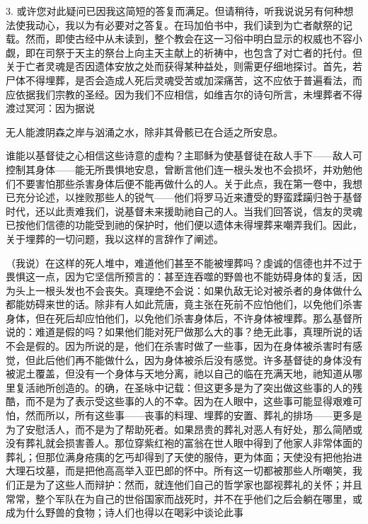 3. 或许您对此疑问已因我这简短的答复而满足。但请稍待，听我说说另有何种想法使我动心，我以为有必要对之答复。在玛加伯书中，我们读到为亡者献祭的记载。然而，即使古经中从未读到，整个教会在这一习俗中明白显示的权威也不容小觑，即在司祭于天主的祭台上向主天主献上的祈祷中，也包含了对亡者的托付。但关于亡者灵魂是否因遗体安放之处而获得某种益处，则需更仔细地探讨。首先，若尸体不得埋葬，是否会造成人死后灵魂受苦或加深痛苦，这不应依于普遍看法，而应依据我们宗教的圣经。因为我们不应相信，如维吉尔的诗句所言，未埋葬者不得渡过冥河：因为据说\par

无人能渡阴森之岸与汹涌之水，\newline{}除非其骨骸已在合适之所安息。\newline{}\par

谁能以基督徒之心相信这些诗意的虚构？主耶稣为使基督徒在敌人手下——敌人可控制其身体——能无所畏惧地安息，曾断言他们连一根头发也不会损坏，并劝勉他们不要害怕那些杀害身体后便不能再做什么的人。关于此点，我在第一卷中，我想已充分论述，以挫败那些人的锐气——他们将罗马近来遭受的野蛮蹂躏归咎于基督时代，还以此责难我们，说基督未来援助祂自己的人。当我们回答说，信友的灵魂已按他们信德的功能受到祂的保护时，他们便以遗体未得埋葬来嘲弄我们。因此，关于埋葬的一切问题，我以这样的言辞作了阐述。\par

（我说）在这样的死人堆中，难道他们甚至不能被埋葬吗？虔诚的信德也并不过于畏惧这一点，因为它坚信所预言的：甚至连吞噬的野兽也不能妨碍身体的复活，因为头上一根头发也不会丧失。真理绝不会说：如果仇敌无论对被杀者的身体做什么都能妨碍来世的话。除非有人如此荒唐，竟主张在死前不应怕他们，以免他们杀害身体，但在死后却应怕他们，以免他们杀害身体后，不许身体被埋葬。那么基督所说的：难道是假的吗？如果他们能对死尸做那么大的事？绝无此事，真理所说的话不会是假的。因为所说的是，他们在杀害时做了一些事，因为在身体被杀害时有感觉，但此后他们再不能做什么，因为身体被杀后没有感觉。许多基督徒的身体没有被泥土覆盖，但没有一个身体与天地分离，祂以自己的临在充满天地，祂知道从哪里复活祂所创造的。的确，在圣咏中记载：但这更多是为了突出做这些事的人的残酷，而不是为了表示受这些事的人的不幸。因为在人眼中，这些事可能显得艰难可怕，然而所以，所有这些事——丧事的料理、埋葬的安置、葬礼的排场——更多是为了安慰活人，而不是为了帮助死者。如果昂贵的葬礼对恶人有好处，那么简陋或没有葬礼就会损害善人。那位穿紫红袍的富翁在世人眼中得到了他家人非常体面的葬礼；但那位满身疮痍的乞丐却得到了天使的服侍，更为体面；天使没有把他抬进大理石坟墓，而是把他高高举入亚巴郎的怀中。所有这一切都被那些人所嘲笑，我们正是为了这些人而辩护：然而，就连他们自己的哲学家也鄙视葬礼的关怀；并且常常，整个军队在为自己的世俗国家而战死时，并不在乎他们之后会躺在哪里，或成为什么野兽的食物；诗人们也得以在喝彩中谈论此事\par


